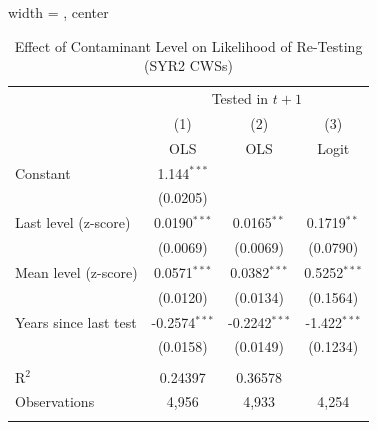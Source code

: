 
\begin{table}[htbp]
   
   \caption{\label{tab:monitoring_retesting} Effect of Contaminant Level on Likelihood of Re-Testing (SYR2 CWSs)}
   \bigskip
   
   \centering
   
   \begin{adjustbox}{width = \textwidth, center}
      
      
      \begin{tabular}{lccc}
         \toprule
         
          & \multicolumn{3}{c}{Tested in $t+1$}\\
         
                               & (1)             & (2)             & (3)\\  
         
                               &  OLS            & OLS             & Logit\\  
         
         \midrule 
         Constant              & 1.144$^{***}$   &                 &   \\   
                               & (0.0205)        &                 &   \\   
         Last level (z-score)  & 0.0190$^{***}$  & 0.0165$^{**}$   & 0.1719$^{**}$\\   
                               & (0.0069)        & (0.0069)        & (0.0790)\\   
         Mean level (z-score)  & 0.0571$^{***}$  & 0.0382$^{***}$  & 0.5252$^{***}$\\   
                               & (0.0120)        & (0.0134)        & (0.1564)\\   
         Years since last test & -0.2574$^{***}$ & -0.2242$^{***}$ & -1.422$^{***}$\\   
                               & (0.0158)        & (0.0149)        & (0.1234)\\   
         
          \\
         
         R$^2$                 & 0.24397         & 0.36578         & \\  
         Observations          & 4,956           & 4,933           & 4,254\\  
         
          \\
         

\end{tabular}
\end{adjustbox}
\end{table}
